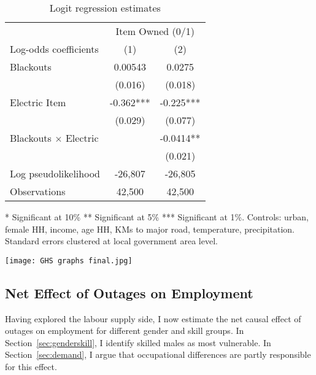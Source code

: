 \documentclass[12pt]{article}
\begin{document}
\begin{table}[htbp]
  \centering
  \footnotesize
    \vspace{5pt}
    \centering
    \caption{Logit regression estimates}
    \label{tab:results1}
    \begin{tabular}{lcc}
        \hline\hline
        & \multicolumn{2}{c}{Item Owned (0/1)} \\
        \cline{2-3}
        Log-odds coefficients& (1) & (2) \\
        \hline
        Blackouts  & 0.00543  & 0.0275 \\
        & (0.016)   & (0.018) \\
        Electric Item & -0.362*** &   -0.225*** \\
        & (0.029) & (0.077) \\
        Blackouts $\times$ Electric &   & -0.0414**  \\
        &  & (0.021) \\
        \hline
        Log pseudolikelihood & -26,807  & -26,805 \\
        Observations     &    42,500    &  42,500   \\
        \hline
    \end{tabular}  
    \begin{flushleft}
    \scriptsize
    * Significant at 10\% ** Significant at 5\% *** Significant at 1\%. Controls: urban, female HH, income, age HH, KMs to major road, temperature, precipitation. Standard errors clustered at local government area level.
    \end{flushleft}
\end{table}
\begin{centering}
    \texttt{[image: GHS graphs final.jpg]}
    \label{fig:marginplots1}
\end{centering}

\newpage
\subsection{Net Effect of Outages on Employment} \label{subsec:neresults}
Having explored the labour supply side, I now estimate the net causal effect of outages on employment for different gender and skill groups. In Section~\ref{sec:genderskill}, I identify skilled males as most vulnerable. In Section~\ref{sec:demand}, I argue that occupational differences are partly responsible for this effect.
\end{document}
